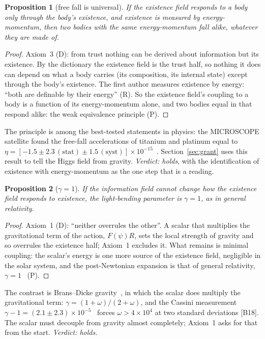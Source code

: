 \documentclass[11pt,a4paper]{article}
\newtheorem{proposition}{Proposition}
\theoremstyle{definition}
\newcommand{\chk}[1]{\textsf{[#1]}}
\newcommand{\tagD}{\textsf{(D)}}
\newcommand{\tagR}{\textsf{(R)}}
\newcommand{\tagP}{\textsf{(P)}}
\begin{document}
\begin{proposition}[free fall is universal]\label{pr:wep}
If the existence field responds to a body only through the body's existence, and existence is measured by energy-momentum, then two bodies
with the same energy-momentum fall alike, whatever they are made of.
\end{proposition}

\begin{proof}
Axiom~3 \tagD: from trust nothing can be derived about information but its existence. By the dictionary the existence field is the trust
half, so nothing it does can depend on what a body carries (its composition, its internal state) except through the body's existence. The
first author measures existence by energy: ``both are definable by their energy'' \tagR. So the existence field's coupling to a body is a
function of its energy-momentum alone, and two bodies equal in that respond alike: the weak equivalence principle \tagP.
\end{proof}

\noindent The principle is among the best-tested statements in physics: the MICROSCOPE satellite found the free-fall accelerations of
titanium and platinum equal to $\eta=[-1.5\pm2.3\,(\text{stat})\pm1.5\,(\text{syst})]\times10^{-15}$~\cite{microscope}. Section~\ref{sec:grant}
uses this result to tell the Higgs field from gravity. \emph{Verdict: holds}, with the identification of existence with energy-momentum as
the one step that is a reading.

\begin{proposition}[$\gamma=1$]\label{pr:gamma}
If the information field cannot change how the existence field responds to existence, the light-bending parameter is $\gamma=1$, as in
general relativity.
\end{proposition}

\begin{proof}
Axiom~1 \tagD: ``neither overrules the other''. A scalar that multiplies the gravitational term of the action, $F(\psi)R$, sets the local
strength of gravity and so overrules the existence half; Axiom~1 excludes it. What remains is minimal coupling: the scalar's energy is one
more source of the existence field, negligible in the solar system, and the post-Newtonian expansion is that of general relativity,
$\gamma=1$~\cite{will} \tagP.
\end{proof}

\noindent The contrast is Brans--Dicke gravity~\cite{bd}, in which the scalar does multiply the gravitational term:
$\gamma=(1+\omega)/(2+\omega)$, and the Cassini measurement $\gamma-1=(2.1\pm2.3)\times10^{-5}$~\cite{cassini} forces $\omega>4\times10^4$ at
two standard deviations \chk{B18}. The scalar must decouple from gravity almost completely; Axiom~1 asks for that from the start.
\emph{Verdict: holds.}
\end{document}
